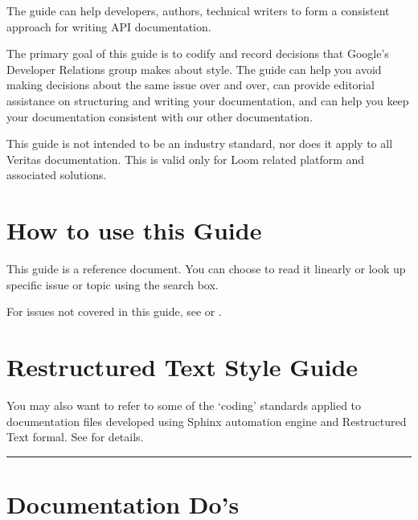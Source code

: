 \documentclass[letterpaper,10pt,english]{sphinxmanual}
\begin{document}
The guide can help developers, authors, technical writers to form a consistent approach for writing API documentation.

The primary goal of this guide is to codify and record decisions that Google’s Developer Relations group makes about style. The guide can help you avoid making decisions about the same issue over and over, can provide editorial assistance on structuring and writing your documentation, and can help you keep your documentation consistent with our other documentation.

This guide is not intended to be an industry standard, nor does it apply to all Veritas documentation.  This is valid only for Loom related platform and associated solutions.


\section{How to use this Guide}
\label{\detokenize{mcdmp_docx_res:how-to-use-this-guide}}
This guide is a reference document.  You can choose to read it linearly or look up specific issue or topic using the search box.

For issues not covered in this guide, see  or .


\section{Restructured Text Style Guide}
\label{\detokenize{mcdmp_docx_res:restructured-text-style-guide}}
You may also want to refer to some of the ‘coding’ standards applied to documentation files developed using Sphinx automation engine and Restructured Text formal.  See  for details.


\bigskip\hrule\bigskip



\section{Documentation Do’s}
\label{\detokenize{mcdmp_docx_res:documentation-do-s}}
\end{document}
